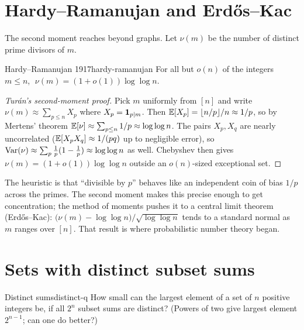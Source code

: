 \section{Hardy--Ramanujan and Erd\H{o}s--Kac}

The second moment reaches beyond graphs. Let $\nu(m)$ be the number of distinct
prime divisors of $m$.

\begin{theorem}{Hardy--Ramanujan 1917}{hardy-ramanujan}
For all but $o(n)$ of the integers $m\le n$, $\;\nu(m)=(1+o(1))\log\log n$.
\end{theorem}

\begin{proof}[Tur\'an's second-moment proof]
Pick $m$ uniformly from $[n]$ and write $\nu(m)\approx\sum_{p\le n}X_p$ where
$X_p=\mathbf{1}_{p\mid m}$. Then $\mathbb{E}[X_p]=\lfloor n/p\rfloor/n\approx1/p$, so by
Mertens' theorem $\mathbb{E}[\nu]\approx\sum_{p\le n}1/p\approx\log\log n$. The pairs
$X_p,X_q$ are nearly uncorrelated ($\mathbb{E}[X_pX_q]\approx1/(pq)$ up to negligible
error), so $\operatorname{Var}(\nu)\approx\sum_p\tfrac1p(1-\tfrac1p)\approx\log\log n$ as well.
Chebyshev then gives $\nu(m)=(1+o(1))\log\log n$ outside an $o(n)$-sized
exceptional set.
\end{proof}

\begin{insight}
The heuristic is that ``divisible by $p$'' behaves like an independent coin of
bias $1/p$ across the primes. The second moment makes this precise enough to get
concentration; the method of moments pushes it to a central limit theorem
(Erd\H{o}s--Kac): $\bigl(\nu(m)-\log\log n\bigr)/\sqrt{\log\log n}$ tends to a
standard normal as $m$ ranges over $[n]$. That result is where probabilistic
number theory began.
\end{insight}

\section{Sets with distinct subset sums}

\begin{question}{Distinct sums}{distinct-q}
How small can the largest element of a set of $n$ positive integers be, if all
$2^n$ subset sums are distinct? (Powers of two give largest element $2^{n-1}$;
can one do better?)
\end{question}

